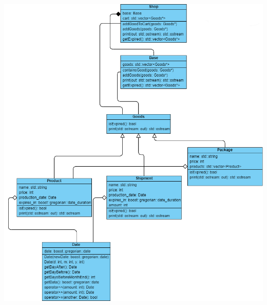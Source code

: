 \documentclass[a4paper,14pt]{extarticle}
\begin{document}
\includegraphics[width=190mm]{task2}
\end{document}
